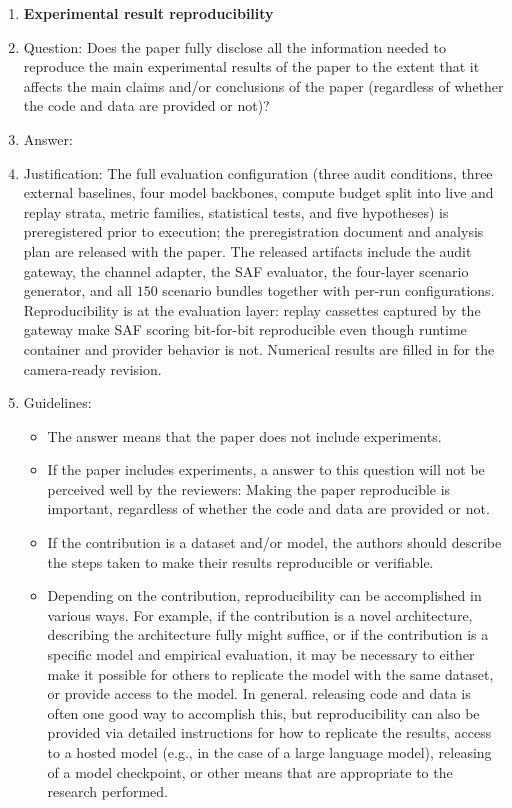 \begin{enumerate}
    \item {\bf Experimental result reproducibility}
    \item[] Question: Does the paper fully disclose all the information needed to reproduce the main experimental results of the paper to the extent that it affects the main claims and/or conclusions of the paper (regardless of whether the code and data are provided or not)?
    \item[] Answer: \answerYes{}
    \item[] Justification: The full evaluation configuration (three audit conditions, three external baselines, four model backbones, compute budget split into live and replay strata, metric families, statistical tests, and five hypotheses) is preregistered prior to execution; the preregistration document and analysis plan are released with the paper. The released artifacts include the audit gateway, the channel adapter, the SAF evaluator, the four-layer scenario generator, and all $150$ scenario bundles together with per-run configurations. Reproducibility is at the evaluation layer: replay cassettes captured by the gateway make SAF scoring bit-for-bit reproducible even though runtime container and provider behavior is not. Numerical results are filled in for the camera-ready revision.
    \item[] Guidelines:
    \begin{itemize}
        \item The answer \answerNA{} means that the paper does not include experiments.
        \item If the paper includes experiments, a \answerNo{} answer to this question will not be perceived well by the reviewers: Making the paper reproducible is important, regardless of whether the code and data are provided or not.
        \item If the contribution is a dataset and\slash or model, the authors should describe the steps taken to make their results reproducible or verifiable.
        \item Depending on the contribution, reproducibility can be accomplished in various ways. For example, if the contribution is a novel architecture, describing the architecture fully might suffice, or if the contribution is a specific model and empirical evaluation, it may be necessary to either make it possible for others to replicate the model with the same dataset, or provide access to the model. In general. releasing code and data is often one good way to accomplish this, but reproducibility can also be provided via detailed instructions for how to replicate the results, access to a hosted model (e.g., in the case of a large language model), releasing of a model checkpoint, or other means that are appropriate to the research performed.

\end{itemize}
\end{enumerate}
